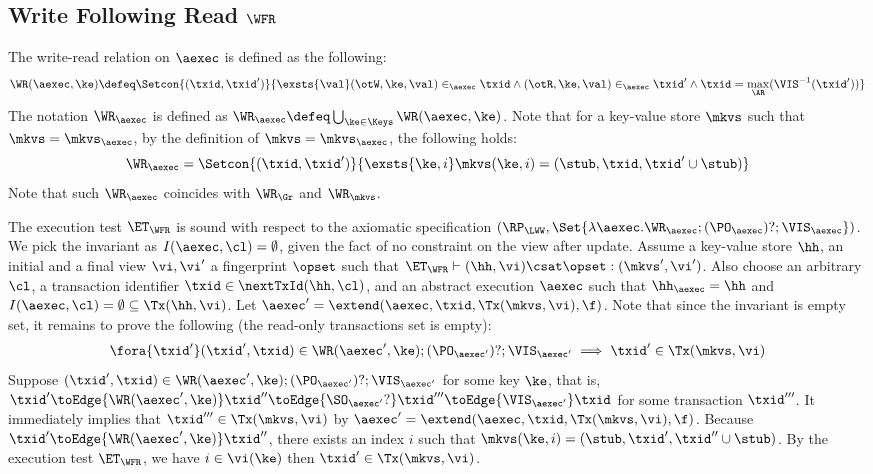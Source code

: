 \subsection{Write Following Read \( \WFR \) }
\label{sec:sound-complete-wfr}

The write-read relation  on \( \aexec \) is defined as the following:
\[
\WR(\aexec, \ke) \defeq \Setcon{ (\txid, \txid') }{ \exsts{\val} (\otW, \ke, \val) \in_\aexec \txid \land (\otR, \ke, \val) \in_\aexec \txid' \land \txid = \max_\AR(\VIS^{-1}(\txid')) }
\]
The notation \( \WR_\aexec \) is defined as \( \WR_\aexec \defeq \bigcup_{\ke \in \Keys} \WR(\aexec, \ke) \).
Note that for a key-value store \( \mkvs \) such that \( \mkvs = \mkvs_\aexec \),
by the definition of  \(  \mkvs = \mkvs_\aexec \), 
the following holds:
\[
    \WR_\aexec = \Setcon{(\txid, \txid')}{\exsts{\ke, i } \mkvs(\ke, i) = (\stub, \txid, \txid'\cup \stub)}
\]
Note that such \( \WR_\aexec \) coincides with \( \WR_\Gr \) and \( \WR_\mkvs \).

The execution test $\ET_\WFR$ is sound with respect to the axiomatic specification 
\( (\RP_{\LWW}, \Set{\lambda \aexec. \WR_\aexec ; (\PO_{\aexec})? ; \VIS_{\aexec} })\).
We pick the invariant as \( I( \aexec, \cl ) = \emptyset \), given the fact of no constraint on the view after update.
Assume a key-value store $\hh$, an initial and a final view $\vi, \vi'$  a fingerprint $\opset$ 
such that $\ET_{\WFR} \vdash (\hh, \vi) \csat \opset: (\mkvs', \vi')$. 
Also choose an arbitrary $\cl$, a transaction identifier $\txid \in \nextTxId(\hh, \cl)$, 
and an abstract execution $\aexec$ such that $\hh_{\aexec} = \hh$ and 
\( I(\aexec, \cl) =  \emptyset \subseteq \Tx(\hh, \vi) \).
Let \( \aexec' = \extend(\aexec, \txid, \Tx(\mkvs, \vi) , \f ) \).
Note that since the invariant is empty set, it remains to prove the following (the read-only transactions set is empty):
\[
    \begin{array}{@{}l@{}}
        \fora{ \txid' } 
        (\txid' ,\txid)  \in \WR(\aexec',\ke) ; (\PO_{\aexec'})? ; \VIS_{\aexec'} 
        \implies \txid' \in \Tx(\mkvs, \vi) 
    \end{array}
\]
Suppose \( (\txid' ,\txid)  \in \WR(\aexec', \ke) ; (\PO_{\aexec'})? ; \VIS_{\aexec'} \) for some key \( \ke \),
that is, \( \txid' \toEdge{\WR(\aexec', \ke)} \txid'' \toEdge{\SO_{\aexec'}?} \txid''' \toEdge{\VIS_{\aexec'}} \txid \) for some transaction \( \txid''' \).
It immediately implies that \( \txid''' \in \Tx(\mkvs, \vi)  \) by \( \aexec' = \extend(\aexec, \txid, \Tx(\mkvs, \vi) , \f ) \).
Because \( \txid' \toEdge{\WR(\aexec', \ke)} \txid'' \), there exists an index \( i \) such that \( \mkvs(\ke, i) = (\stub, \txid', \txid'' \cup \stub) \).
By the execution test \( \ET_\WFR \), we have \( i \in \vi( \ke ) \) then \( \txid' \in \Tx(\mkvs, \vi ) \).


